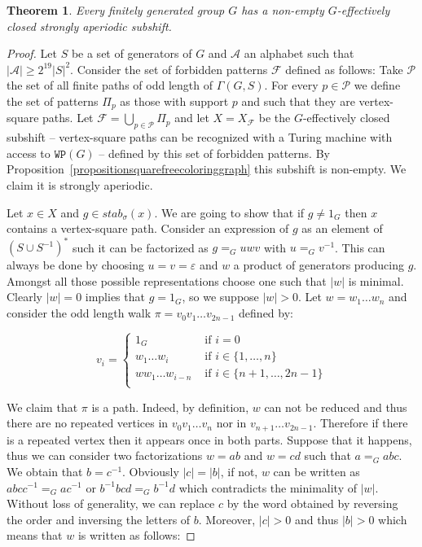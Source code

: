 \documentclass[letterpaper]{article}
\theoremstyle{plain}
\newtheorem{theorem}{Theorem}[section]
\def\ag{\mathcal{A}}
\def\FF{\mathcal{F}}
\begin{document}
		\begin{theorem}
			\label{theorem.strongly_aperiodic1}
			Every finitely generated group $G$ has a non-empty $G$-effectively closed strongly aperiodic subshift.
		\end{theorem}
		
		\begin{proof}
			Let $S$ be a set of generators of $G$ and $\ag$ an alphabet such that $|\ag| \geq 2^{19}|S|^2$. Consider the set of forbidden patterns $\FF$ defined as follows: Take $\mathcal{P}$ the set of all finite paths of odd length of $\Gamma(G,S)$. For every $p\in \mathcal{P}$ we define the set of patterns $\Pi_p$ as those with support $p$ and such that they are vertex-square paths. Let $\FF = \bigcup_{p\in \mathcal{P}}\Pi_p$ and let $X = X_{\FF}$ be the $G$-effectively closed subshift -- vertex-square paths can be recognized with a Turing machine with access to $\texttt{WP}(G)$ -- defined by this set of forbidden patterns. By Proposition~\ref{propositionsquarefreecoloringgraph} this subshift is non-empty. We claim it is strongly aperiodic.
			
			Let $x \in X$ and $g \in stab_{\sigma}(x)$. We are going to show that if $g \neq 1_G$ then $x$ contains a vertex-square path. Consider an expression of $g$ as an element of $(S\cup S^{-1})^*$ such it can be factorized as $g=_G uwv$ with $u =_G v^{-1}$. This can always be done by choosing $u=v=\varepsilon$ and $w$ a product of generators producing $g$. Amongst all those possible representations choose one such that $|w|$ is minimal. Clearly $|w| = 0$ implies that $g = 1_G$, so we suppose $|w|>0$. Let $w = w_1\dots w_n$ and consider the odd length walk $\pi = v_0v_1\dots v_{2n-1}$ defined by:
			
			$$v_i = \begin{cases}
			1_G & \text{ if } i = 0 \\
			w_1\dots w_i &\text{ if } i\in \{1,\dots, n \} \\
			ww_1\dots w_{i-n}& \text{ if } i\in \{n+1,\dots, 2n-1 \} \\
			\end{cases}$$
			
			We claim that $\pi$ is a path. Indeed, by definition, $w$ can not be reduced and thus there are no repeated vertices in $v_0v_1\dots v_n$ nor in $v_{n+1}\dots v_{2n-1}$. Therefore if there is a repeated vertex then it appears once in both parts. Suppose that it happens, thus we can consider two factorizations $w = ab$ and $w = cd$ such that $a =_G abc$. We obtain that $b = c^{-1}$. Obviously $|c| = |b|$, if not, $w$ can be written as $abcc^{-1}=_G ac^{-1}$ or $b^{-1}bcd=_G b^{-1}d$ which contradicts the minimality of $|w|$. Without loss of generality, we can replace $c$ by the word obtained by reversing the order and inversing the letters of $b$.  Moreover, $|c|>0$ and thus $|b| > 0$ which means that $w$ is written as follows:
			

\end{proof}
\end{document}
